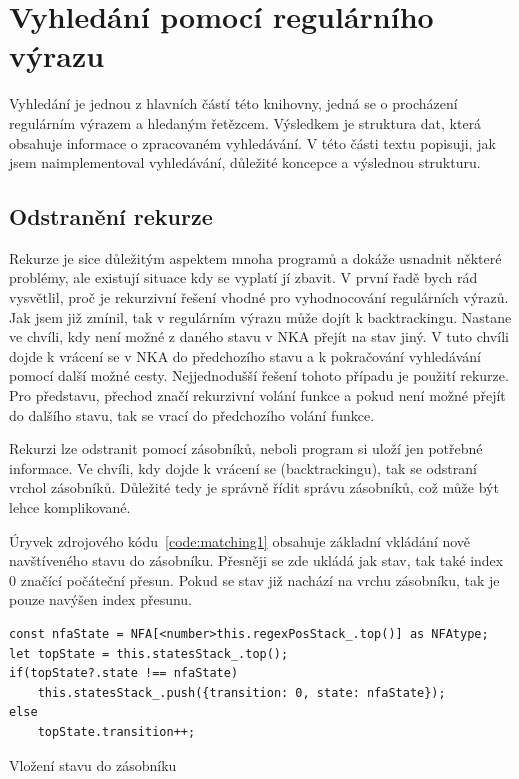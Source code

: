 \newpage

\section{Vyhledání pomocí regulárního výrazu}\label{sec:PatternMatching}

Vyhledání je jednou z hlavních částí této knihovny, jedná se o procházení regulárním výrazem a hledaným řetězcem.
Výsledkem je struktura dat, která obsahuje informace o zpracovaném vyhledávání.
V této části textu popisuji, jak jsem naimplementoval vyhledávání, důležité koncepce a výslednou strukturu.

\subsection*{Odstranění rekurze}

Rekurze je sice důležitým aspektem mnoha programů a dokáže usnadnit některé problémy, ale existují situace kdy se vyplatí jí zbavit.
V první řadě bych rád vysvětlil, proč je rekurzivní řešení vhodné pro vyhodnocování regulárních výrazů.
Jak jsem již zmínil, tak v regulárním výrazu může dojít k backtrackingu.
Nastane ve chvíli, kdy není možné z daného stavu v NKA přejít na stav jiný.
V tuto chvíli dojde k vrácení se v NKA do předchozího stavu a k pokračování vyhledávání pomocí další možné cesty.
Nejjednodušší řešení tohoto případu je použití rekurze.
Pro představu, přechod značí rekurzivní volání funkce a pokud není možné přejít do dalšího stavu, tak se vrací do předchozího volání funkce.

Rekurzi lze odstranit pomocí zásobníků, neboli program si uloží jen potřebné informace.
Ve chvíli, kdy dojde k vrácení se (backtrackingu), tak se odstraní vrchol zásobníků.
Důležité tedy je správně řídit správu zásobníků, což může být lehce komplikované.

Úryvek zdrojového kódu~\ref{code:matching1} obsahuje základní vkládání nově navštíveného stavu do zásobníku.
Přesněji se zde ukládá jak stav, tak také index 0 značící počáteční přesun.
Pokud se stav již nachází na vrchu zásobníku, tak je pouze navýšen index přesunu.

\begin{code}[!ht]
	\begin{verbatim}
const nfaState = NFA[<number>this.regexPosStack_.top()] as NFAtype;
let topState = this.statesStack_.top();
if(topState?.state !== nfaState)
	this.statesStack_.push({transition: 0, state: nfaState});
else
	topState.transition++;
	\end{verbatim}
	\caption{Vložení stavu do zásobníku}
	\label{code:matching1}
\end{code}

